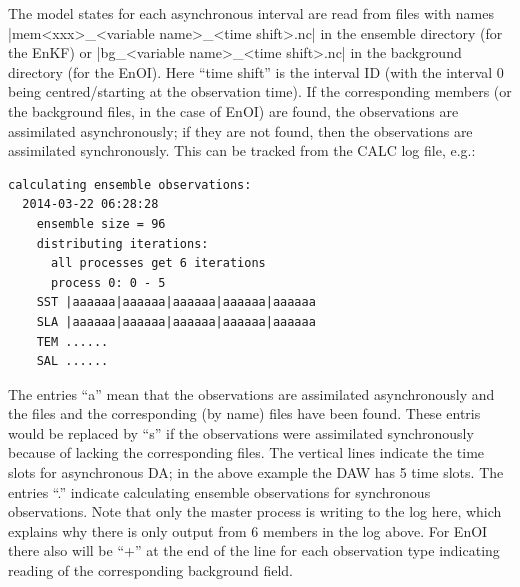 \documentclass[11pt]{report}
\begin{document}
The model states for each asynchronous interval are read from files with names \spverb|mem<xxx>_<variable name>_<time shift>.nc| in the ensemble directory (for the EnKF) or \spverb|bg_<variable name>_<time shift>.nc| in the background directory (for the EnOI).
Here ``time shift'' is the interval ID (with the interval 0 being centred/starting at the observation time).
If the corresponding members (or the background files, in the case of EnOI) are found, the observations are assimilated asynchronously; if they are not found, then the observations are assimilated synchronously.
This can be tracked from the CALC log file, e.g.:
\begin{Verbatim}[frame=single,fontsize=\footnotesize]
  calculating ensemble observations:
  2014-03-22 06:28:28
    ensemble size = 96
    distributing iterations:
      all processes get 6 iterations
      process 0: 0 - 5
    SST |aaaaaa|aaaaaa|aaaaaa|aaaaaa|aaaaaa
    SLA |aaaaaa|aaaaaa|aaaaaa|aaaaaa|aaaaaa
    TEM ......
    SAL ......
\end{Verbatim}
The entries ``a'' mean that the observations are assimilated asynchronously and the files and the corresponding (by name) files have been found.
These entris would be replaced by ``s'' if the observations were assimilated synchronously because of lacking the corresponding files.
The vertical lines indicate the time slots for asynchronous DA; in the above example the DAW has 5 time slots.
The entries ``.'' indicate calculating ensemble observations for synchronous observations.
Note that only the master process is writing to the log here, which explains why there is only output from 6 members in the log above.
For EnOI there also will be ``+'' at the end of the line for each observation type indicating reading of the corresponding background field.
\end{document}
